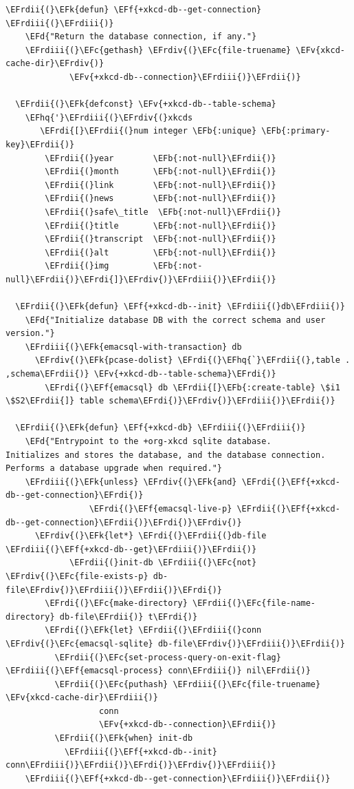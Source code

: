 \documentclass{scrartcl}
\newcommand{\EFk}[1]{\textcolor{EFk}{#1}} %
\newcommand{\EFd}[1]{\textcolor{EFd}{#1}} %
\newcommand{\EFb}[1]{\textcolor{EFb}{#1}} %
\newcommand{\EFc}[1]{\textcolor{EFc}{#1}} %
\newcommand{\EFv}[1]{\textcolor{EFv}{#1}} %
\newcommand{\EFf}[1]{\textcolor{EFf}{#1}} %
\newcommand{\EFhq}[1]{#1} %
\newcommand{\EFrdi}[1]{#1} %
\newcommand{\EFrdii}[1]{#1} %
\newcommand{\EFrdiii}[1]{#1} %
\newcommand{\EFrdiv}[1]{#1} %
\begin{document}
\begin{Code}
\begin{Verbatim}[]
  \EFrdii{(}\EFk{defun} \EFf{+xkcd-db--get-connection} \EFrdiii{(}\EFrdiii{)}
    \EFd{"Return the database connection, if any."}
    \EFrdiii{(}\EFc{gethash} \EFrdiv{(}\EFc{file-truename} \EFv{xkcd-cache-dir}\EFrdiv{)}
             \EFv{+xkcd-db--connection}\EFrdiii{)}\EFrdii{)}

  \EFrdii{(}\EFk{defconst} \EFv{+xkcd-db--table-schema}
    \EFhq{'}\EFrdiii{(}\EFrdiv{(}xkcds
       \EFrdi{[}\EFrdii{(}num integer \EFb{:unique} \EFb{:primary-key}\EFrdii{)}
        \EFrdii{(}year        \EFb{:not-null}\EFrdii{)}
        \EFrdii{(}month       \EFb{:not-null}\EFrdii{)}
        \EFrdii{(}link        \EFb{:not-null}\EFrdii{)}
        \EFrdii{(}news        \EFb{:not-null}\EFrdii{)}
        \EFrdii{(}safe\_title  \EFb{:not-null}\EFrdii{)}
        \EFrdii{(}title       \EFb{:not-null}\EFrdii{)}
        \EFrdii{(}transcript  \EFb{:not-null}\EFrdii{)}
        \EFrdii{(}alt         \EFb{:not-null}\EFrdii{)}
        \EFrdii{(}img         \EFb{:not-null}\EFrdii{)}\EFrdi{]}\EFrdiv{)}\EFrdiii{)}\EFrdii{)}

  \EFrdii{(}\EFk{defun} \EFf{+xkcd-db--init} \EFrdiii{(}db\EFrdiii{)}
    \EFd{"Initialize database DB with the correct schema and user version."}
    \EFrdiii{(}\EFk{emacsql-with-transaction} db
      \EFrdiv{(}\EFk{pcase-dolist} \EFrdi{(}\EFhq{`}\EFrdii{(},table . ,schema\EFrdii{)} \EFv{+xkcd-db--table-schema}\EFrdi{)}
        \EFrdi{(}\EFf{emacsql} db \EFrdii{[}\EFb{:create-table} \$i1 \$S2\EFrdii{]} table schema\EFrdi{)}\EFrdiv{)}\EFrdiii{)}\EFrdii{)}

  \EFrdii{(}\EFk{defun} \EFf{+xkcd-db} \EFrdiii{(}\EFrdiii{)}
    \EFd{"Entrypoint to the +org-xkcd sqlite database.
Initializes and stores the database, and the database connection.
Performs a database upgrade when required."}
    \EFrdiii{(}\EFk{unless} \EFrdiv{(}\EFk{and} \EFrdi{(}\EFf{+xkcd-db--get-connection}\EFrdi{)}
                 \EFrdi{(}\EFf{emacsql-live-p} \EFrdii{(}\EFf{+xkcd-db--get-connection}\EFrdii{)}\EFrdi{)}\EFrdiv{)}
      \EFrdiv{(}\EFk{let*} \EFrdi{(}\EFrdii{(}db-file \EFrdiii{(}\EFf{+xkcd-db--get}\EFrdiii{)}\EFrdii{)}
             \EFrdii{(}init-db \EFrdiii{(}\EFc{not} \EFrdiv{(}\EFc{file-exists-p} db-file\EFrdiv{)}\EFrdiii{)}\EFrdii{)}\EFrdi{)}
        \EFrdi{(}\EFc{make-directory} \EFrdii{(}\EFc{file-name-directory} db-file\EFrdii{)} t\EFrdi{)}
        \EFrdi{(}\EFk{let} \EFrdii{(}\EFrdiii{(}conn \EFrdiv{(}\EFc{emacsql-sqlite} db-file\EFrdiv{)}\EFrdiii{)}\EFrdii{)}
          \EFrdii{(}\EFc{set-process-query-on-exit-flag} \EFrdiii{(}\EFf{emacsql-process} conn\EFrdiii{)} nil\EFrdii{)}
          \EFrdii{(}\EFc{puthash} \EFrdiii{(}\EFc{file-truename} \EFv{xkcd-cache-dir}\EFrdiii{)}
                   conn
                   \EFv{+xkcd-db--connection}\EFrdii{)}
          \EFrdii{(}\EFk{when} init-db
            \EFrdiii{(}\EFf{+xkcd-db--init} conn\EFrdiii{)}\EFrdii{)}\EFrdi{)}\EFrdiv{)}\EFrdiii{)}
    \EFrdiii{(}\EFf{+xkcd-db--get-connection}\EFrdiii{)}\EFrdii{)}


\end{Verbatim}
\end{Code}
\end{document}
